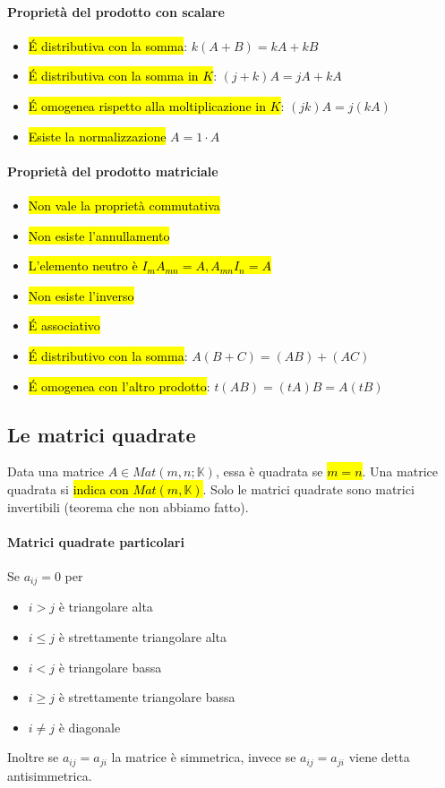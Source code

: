 \paragraph{Proprietà del prodotto con scalare}
\begin{itemize}
    \item \hl{\'E distributiva con la somma}: $k (A + B) = kA + kB$
    \item \hl{\'E distributiva con la somma in $K$}: $(j + k)A = jA + kA$
    \item \hl{\'E omogenea rispetto alla moltiplicazione in $K$}:
        $(jk)A = j(kA)$
    \item \hl{Esiste la normalizzazione} $A = 1 \cdot A$
\end{itemize}

\paragraph{Proprietà del prodotto matriciale}
\begin{itemize}
    \item \hl{Non vale la proprietà commutativa}
    \item \hl{Non esiste l'annullamento}
    \item \hl{L'elemento neutro è $I_{m}A_{mn} = A, A_{mn}I_{n} = A$}
    \item \hl{Non esiste l'inverso}
    \item \hl{\'E associativo}
    \item \hl{\'E distributivo con la somma}: $A(B+C) = (AB) + (AC)$
    \item \hl{\'E omogenea con l'altro prodotto}: $t(AB) = (tA)B = A(tB)$
\end{itemize}

\subsection{Le matrici quadrate}
Data una matrice $A \in Mat(m,n;\mathbb{K})$, essa è quadrata se \hl{$m = n$}.
Una matrice quadrata si \hl{indica con $Mat(m,\mathbb{K})$}. Solo le matrici
quadrate sono matrici invertibili (teorema che non abbiamo fatto).

\paragraph{Matrici quadrate particolari} Se $a_{ij} = 0$ per
\begin{itemize}
    \item $i>j$ è triangolare alta
    \item $i \leq j$ è strettamente triangolare alta
    \item $i<j$ è triangolare bassa
    \item $i \geq j$ è strettamente triangolare bassa
    \item $i \neq j$ è diagonale
\end{itemize}
Inoltre se $a_{ij} = a_{ji}$ la matrice è simmetrica, invece se $a_{ij} = a_{ji}$
viene detta antisimmetrica.


